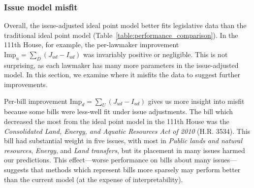 
\subsubsection{Issue model misfit}

Overall, the issue-adjusted ideal point model better fits legislative
data than the traditional ideal point model
(Table~\ref{table:performance_comparison}). In the 111th House, for
example, the per-lawmaker improvement $\mbox{Imp}_u = \sum_D (J_{ud} - I_{ud})$ was
invariably positive or negligible.  This is not surprising, as each
lawmaker has many more parameters in the issue-adjusted model.
In this section, we examine where it misfits the data to suggest further improvements.

Per-bill improvement $\mbox{Imp}_d = \sum_U (J_{ud} - I_{ud})$ gives us more insight
into misfit because some bills were less-well fit under issue
adjustments.  The bill which decreased the most from the ideal point
model in the 111th House was the \emph{Consolidated Land, Energy, and
  Aquatic Resources Act of 2010} (H.R. 3534).  This bill had
substantial weight in five issues, with most in \emph{Public lands and
  natural resources}, \emph{Energy}, and \emph{Land transfers}, but
its placement in many issues harmed our predictions.  This
effect---worse performance on bills about many issues---suggests that
methods which represent bills more sparsely may perform better than
the current model (at the expense of interpretability).



